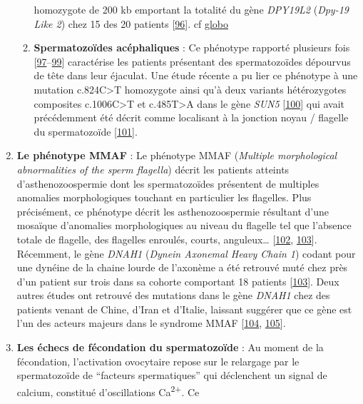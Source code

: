 \documentclass[12pt,a4paper,twoside]{ugathesis}
\theoremstyle{definition}
\theoremstyle{definition}
\theoremstyle{definition}
\theoremstyle{remark}
\begin{document}
\begin{enumerate}
\begin{enumerate}
    homozygote de 200 kb emportant la totalité du gène \emph{DPY19L2}
    (\emph{Dpy-19 Like 2}) chez 15 des 20 patients
    {[}\protect\hyperlink{ref-Harbuz2011}{96}{]}. cf
    \protect\hyperlink{globo}{globo}\\
  \item
    \textbf{Spermatozoïdes acéphaliques} : Ce phénotype rapporté
    plusieurs fois
    {[}\protect\hyperlink{ref-Chemes2010}{97}--\protect\hyperlink{ref-Chemes1987}{99}{]}
    caractérise les patients présentant des spermatozoïdes dépourvus de
    tête dans leur éjaculat. Une étude récente a pu lier ce phénotype à
    une mutation c.824C\textgreater{}T homozygote ainsi qu'à deux
    variants hétérozygotes composites c.1006C\textgreater{}T et
    c.485T\textgreater{}A dans le gène \emph{SUN5}
    {[}\protect\hyperlink{ref-Zhu2016}{100}{]} qui avait précédemment
    été décrit comme localisant à la jonction noyau / flagelle du
    spermatozoïde {[}\protect\hyperlink{ref-Yassine2015}{101}{]}.
  \end{enumerate}
\item
  \textbf{Le phénotype MMAF} : Le phénotype MMAF (\emph{Multiple
  morphological abnormalities of the sperm flagella}) décrit les
  patients atteints d'asthenozoospermie dont les spermatozoïdes
  présentent de multiples anomalies morphologiques touchant en
  particulier les flagelles. Plus précisément, ce phénotype décrit les
  asthenozoospermie résultant d'une mosaïque d'anomalies morphologiques
  au niveau du flagelle tel que l'absence totale de flagelle, des
  flagelles enroulés, courts, anguleux\ldots{}
  {[}\protect\hyperlink{ref-Coutton2015}{102},
  \protect\hyperlink{ref-BenKhelifa2014}{103}{]}. Récemment, le gène
  \emph{DNAH1} (\emph{Dynein Axonemal Heavy Chain 1}) codant pour une
  dynéine de la chaine lourde de l'axonème a été retrouvé muté chez près
  d'un patient sur trois dans sa cohorte comportant 18 patients
  {[}\protect\hyperlink{ref-BenKhelifa2014}{103}{]}. Deux autres études
  ont retrouvé des mutations dans le gène \emph{DNAH1} chez des patients
  venant de Chine, d'Iran et d'Italie, laissant suggérer que ce gène est
  l'un des acteurs majeurs dans le syndrome MMAF
  {[}\protect\hyperlink{ref-Wang2017}{104},
  \protect\hyperlink{ref-Amiri-Yekta2016}{105}{]}.
\item
  \textbf{Les échecs de fécondation du spermatozoïde} : Au moment de la
  fécondation, l'activation ovocytaire repose sur le relargage par le
  spermatozoïde de ``facteurs spermatiques'' qui déclenchent un signal
  de calcium, constitué d'oscillations Ca\textsuperscript{2+}. Ce

\end{enumerate}
\end{document}
